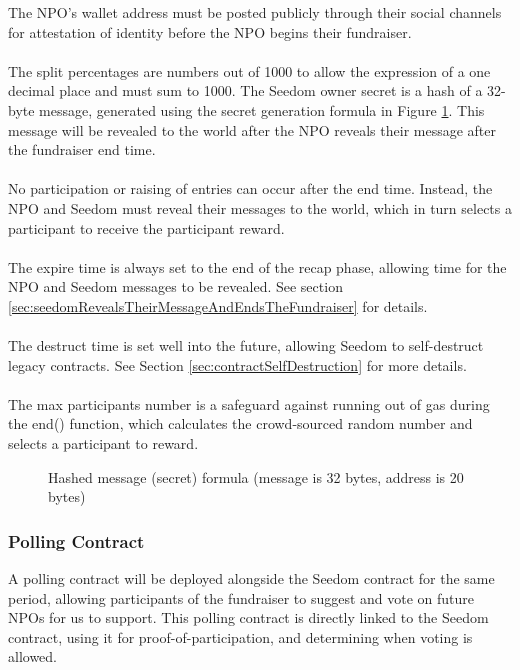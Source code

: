 \documentclass[11pt]{article}
\begin{document}
The NPO's wallet address must be posted publicly through their social channels for attestation of identity before the NPO begins their fundraiser.\\\\
The split percentages are numbers out of 1000 to allow the expression of a one decimal place and must sum to 1000. The Seedom owner secret is a hash of a 32-byte message, generated using the secret generation formula in Figure \ref{figure:secretGenerationFormula}. This message will be revealed to the world after the NPO reveals their message after the fundraiser end time.\\\\
No participation or raising of entries can occur after the end time. Instead, the NPO and Seedom must reveal their messages to the world, which in turn selects a participant to receive the participant reward.\\\\
The expire time is always set to the end of the recap phase, allowing time for the NPO and Seedom messages to be revealed. See section \ref{sec:seedomRevealsTheirMessageAndEndsTheFundraiser} for details.\\\\
The destruct time is set well into the future, allowing Seedom to self-destruct legacy contracts. See Section \ref{sec:contractSelfDestruction} for more details.\\\\
The max participants number is a safeguard against running out of gas during the end() function, which calculates the crowd-sourced random number and selects a participant to reward.

\begin{figure}[H]
\begin{center}
\caption{Hashed message (secret) formula (message is 32 bytes, address is 20 bytes)}
\label{figure:secretGenerationFormula}
\end{center}
\end{figure}

\subsubsection{Polling Contract}

A polling contract will be deployed alongside the Seedom contract for the same period, allowing participants of the fundraiser to suggest and vote on future NPOs for us to support. This polling contract is directly linked to the Seedom contract, using it for proof-of-participation, and determining when voting is allowed.
\end{document}
